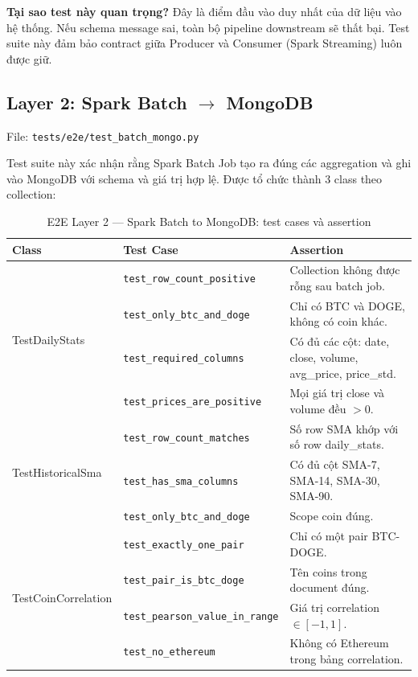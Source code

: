 \documentclass[12pt, a4paper]{article}
\newenvironment{infobox}{%
  \begin{lrbox}{\infoBoxContent}%
  \begin{minipage}[t]{\dimexpr\linewidth-18pt\relax}%
  \setlength{\parskip}{4pt}\small\vspace{4pt}%
}{%
  \vspace{4pt}%
  \end{minipage}%
  \end{lrbox}%
  \par\smallskip\noindent
  \setlength{\fboxsep}{6pt}\setlength{\fboxrule}{0.6pt}%
  \fcolorbox{blue!35!white}{blue!5!white}{\usebox{\infoBoxContent}}%
  \par\smallskip
}
\begin{document}
\begin{infobox}
\textbf{Tại sao test này quan trọng?} Đây là điểm đầu vào duy nhất của dữ liệu vào
hệ thống. Nếu schema message sai, toàn bộ pipeline downstream sẽ thất bại. Test suite
này đảm bảo contract giữa Producer và Consumer (Spark Streaming) luôn được giữ.
\end{infobox}

\subsection{Layer 2: Spark Batch $\to$ MongoDB}

File: \texttt{tests/e2e/test\_batch\_mongo.py}

Test suite này xác nhận rằng Spark Batch Job tạo ra đúng các aggregation và ghi vào
MongoDB với schema và giá trị hợp lệ. Được tổ chức thành 3 class theo collection:

\begin{table}[H]
  \centering
  \caption{E2E Layer 2 --- Spark Batch to MongoDB: test cases và assertion}
  \label{tab:e2e_layer2}
  \begin{tabularx}{\textwidth}{llX}
    \toprule
    Class & Test Case & Assertion \\
    \midrule
    \multirow{4}{*}{TestDailyStats}
      & \texttt{test\_row\_count\_positive} & Collection không được rỗng sau batch job. \\
      & \texttt{test\_only\_btc\_and\_doge} & Chỉ có BTC và DOGE, không có coin khác. \\
      & \texttt{test\_required\_columns} & Có đủ các cột: date, close, volume, avg\_price, price\_std. \\
      & \texttt{test\_prices\_are\_positive} & Mọi giá trị close và volume đều $> 0$. \\
    \midrule
    \multirow{3}{*}{TestHistoricalSma}
      & \texttt{test\_row\_count\_matches} & Số row SMA khớp với số row daily\_stats. \\
      & \texttt{test\_has\_sma\_columns} & Có đủ cột SMA-7, SMA-14, SMA-30, SMA-90. \\
      & \texttt{test\_only\_btc\_and\_doge} & Scope coin đúng. \\
    \midrule
    \multirow{4}{*}{TestCoinCorrelation}
      & \texttt{test\_exactly\_one\_pair} & Chỉ có một pair BTC-DOGE. \\
      & \texttt{test\_pair\_is\_btc\_doge} & Tên coins trong document đúng. \\
      & \texttt{test\_pearson\_value\_in\_range} & Giá trị correlation $\in [-1, 1]$. \\
      & \texttt{test\_no\_ethereum} & Không có Ethereum trong bảng correlation. \\
    \bottomrule
  \end{tabularx}
\end{table}
\end{document}
